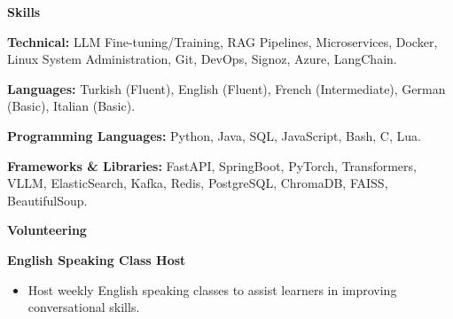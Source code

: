 \documentclass[paper=a4,fontsize=10.3pt]{scrartcl} %
\begin{document}
\begin{center}
    \textbf{Skills}
    \hrulefill
\end{center}

\textbf{Technical:} LLM Fine-tuning/Training, RAG Pipelines, Microservices, Docker, Linux System Administration, Git, DevOps, Signoz, Azure, LangChain.

\textbf{Languages:} Turkish (Fluent), English (Fluent), French (Intermediate), German (Basic), Italian (Basic).

\textbf{Programming Languages:} Python, Java, SQL, JavaScript, Bash, C, Lua.

\textbf{Frameworks \& Libraries:} FastAPI, SpringBoot, PyTorch, Transformers, VLLM, ElasticSearch, Kafka, Redis, PostgreSQL, ChromaDB, FAISS, BeautifulSoup.

\begin{center}
    \textbf{Volunteering}
    \hrulefill
\end{center}
\textbf{English Speaking Class Host} \hfill
\begin{itemize}[noitemsep]
    \item Host weekly English speaking classes to assist learners in improving conversational skills.
\end{itemize}
\end{document}
